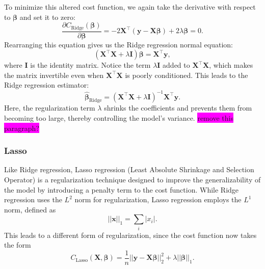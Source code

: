 \documentclass[aps,pra,english,notitlepage,reprint,nofootinbib]{revtex4-1}  %
\begin{document}
To minimize this altered cost function, we again take the derivative with respect to $\boldsymbol{\beta}$ and set it to zero:
\begin{equation}
  \frac{\partial C_{\text{Ridge}}(\boldsymbol{\beta})}{\partial \boldsymbol{\beta}} = -2 \mathbf{X}^\top (\mathbf{y} - \mathbf{X} \boldsymbol{\beta}) + 2 \lambda \boldsymbol{\beta} = 0.
\end{equation}
Rearranging this equation gives us the Ridge regression normal equation:
\begin{equation}
  (\mathbf{X}^\top \mathbf{X} + \lambda \mathbf{I}) \boldsymbol{\beta} = \mathbf{X}^\top \mathbf{y},
\end{equation}
where $\mathbf{I}$ is the identity matrix. Notice the term $\lambda \mathbf{I}$ added to $\mathbf{X}^\top \mathbf{X}$, which makes the matrix invertible even when $\mathbf{X}^\top \mathbf{X}$ is poorly conditioned. This leads to the Ridge regression estimator:
\begin{equation}
  \boldsymbol{\hat{\beta}}_{\text{Ridge}} = (\mathbf{X}^\top \mathbf{X} + \lambda \mathbf{I})^{-1} \mathbf{X}^\top \mathbf{y}.
\end{equation}
Here, the regularization term $\lambda$ shrinks the coefficients and prevents them from becoming too large, thereby controlling the model's variance. \colorbox{magenta}{remove this paragraph?}



\subsubsection{Lasso}\label{subsubsec:lasso} 
Like Ridge regression, Lasso regression (Least Absolute Shrinkage and Selection Operator) is a regularization technique designed to improve the generalizability of the model by introducing a penalty term to the cost function. While Ridge regression uses the $L^2$ norm for regularization, Lasso regression employs the $L^1$ norm, defined as 
\begin{equation*}
  \left|\left|\mathbf{x}\right|\right|_1 = \sum_i|x_i|.
\end{equation*}
This leads to a different form of regularization, since the cost function now takes the form
\begin{equation}
  C_{\text{Lasso}}(\mathbf{X},\boldsymbol{\beta}) = \frac{1}{n}\left|\left|\mathbf{y}-\mathbf{X}\boldsymbol{\beta} \right|\right|_2^2 + \lambda \left|\left|\boldsymbol{\beta}\right|\right|_1.
\end{equation}
\end{document}
